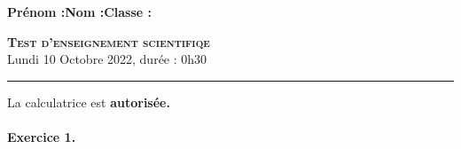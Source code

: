 \documentclass[11pt]{article}
\begin{document}

\noindent\textbf{Prénom :}\hfill\textbf{Nom :}\hfill\textbf{Classe :}\\[1cm]
\begin{center}
\textbf{\LARGE \textsc{Test d'enseignement scientifiqe}}\\[2mm]

{\large Lundi 10 Octobre 2022, durée : 0h30}\\[1mm]
\noindent\rule{12cm}{0.4pt}
\end{center}
La calculatrice est \textbf{autorisée.}

\paragraph{Exercice 1.}
\end{document}
